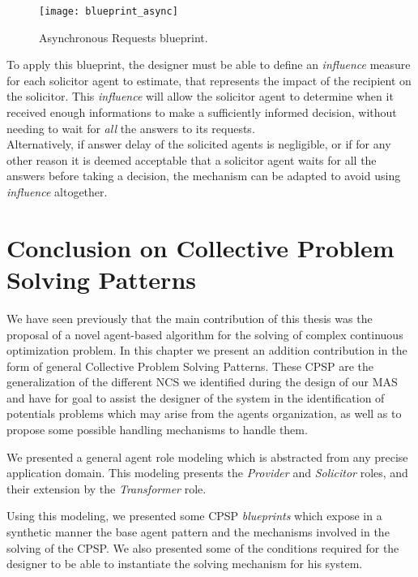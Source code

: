 \begin{figure}
\centering
\texttt{[image: blueprint\_async]}
\caption{Asynchronous Requests blueprint.}\label{blueprint_async}
\end{figure}

To apply this blueprint, the designer must be able to define an \emph{influence} measure for each solicitor agent to estimate, that represents the impact of the recipient on the solicitor. This \emph{influence} will allow the solicitor agent to determine when it received enough informations to make a sufficiently informed decision, without needing to wait for \emph{all} the answers to its requests.\\
Alternatively, if answer delay of the solicited agents is negligible, or if for any other reason it is deemed acceptable that a solicitor agent waits for all the answers before taking a decision, the mechanism can be adapted to avoid using \emph{influence} altogether.

\section{Conclusion on Collective Problem Solving Patterns}

We have seen previously that the main contribution of this thesis was the proposal of a novel agent-based algorithm for the solving of complex continuous optimization problem. In this chapter we present an addition contribution in the form of general Collective Problem Solving Patterns. These CPSP are the generalization of the different NCS we identified during the design of our MAS and have for goal to assist the designer of the system in the identification of potentials problems which may arise from the agents organization, as well as to propose some possible handling mechanisms to handle them.

We presented a general agent role modeling which is abstracted from any precise application domain. This modeling presents the \emph{Provider} and \emph{Solicitor} roles, and their extension by the \emph{Transformer} role.

Using this modeling, we presented some CPSP \emph{blueprints} which expose in a synthetic manner the base agent pattern and the mechanisms involved in the solving of the CPSP. We also presented some of the conditions required for the designer to be able to instantiate the solving mechanism for his system.

